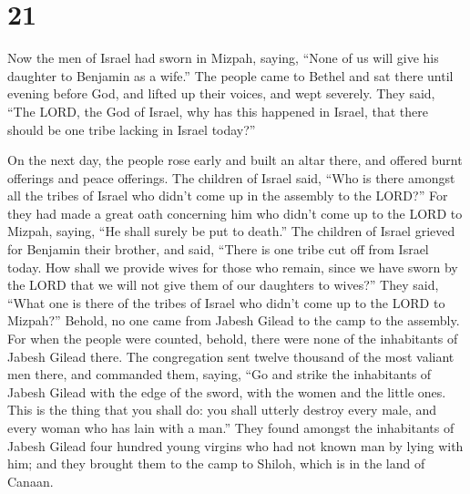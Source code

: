 \hypertarget{section-20}{%
\section{21}\label{section-20}}

 Now the men of Israel had sworn in Mizpah, saying, ``None
of us will give his daughter to Benjamin as a wife.''  The
people came to Bethel and sat there until evening before God, and lifted
up their voices, and wept severely.  They said, ``The LORD,
the God of Israel, why has this happened in Israel, that there should be
one tribe lacking in Israel today?''

 On the next day, the people rose early and built an altar
there, and offered burnt offerings and peace offerings.  The
children of Israel said, ``Who is there amongst all the tribes of Israel
who didn't come up in the assembly to the LORD?'' For they had made a
great oath concerning him who didn't come up to the LORD to Mizpah,
saying, ``He shall surely be put to death.''  The children
of Israel grieved for Benjamin their brother, and said, ``There is one
tribe cut off from Israel today.  How shall we provide wives
for those who remain, since we have sworn by the LORD that we will not
give them of our daughters to wives?''  They said, ``What
one is there of the tribes of Israel who didn't come up to the LORD to
Mizpah?'' Behold, no one came from Jabesh Gilead to the camp to the
assembly.  For when the people were counted, behold, there
were none of the inhabitants of Jabesh Gilead there.  The
congregation sent twelve thousand of the most valiant men there, and
commanded them, saying, ``Go and strike the inhabitants of Jabesh Gilead
with the edge of the sword, with the women and the little ones.
 This is the thing that you shall do: you shall utterly
destroy every male, and every woman who has lain with a man.''
 They found amongst the inhabitants of Jabesh Gilead four
hundred young virgins who had not known man by lying with him; and they
brought them to the camp to Shiloh, which is in the land of Canaan.

